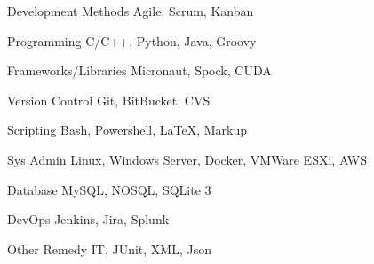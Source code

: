
\begin{cvskills}

  \cvskill
    {Development Methods} %
    {Agile, Scrum, Kanban} %

  \cvskill
    {Programming} %
    {C/C++, Python, Java, Groovy} %

  \cvskill
    {Frameworks/Libraries} %
    {Micronaut, Spock, CUDA} %

  \cvskill
    {Version Control} %
    {Git, BitBucket, CVS} %
    
  \cvskill
    {Scripting} %
    {Bash, Powershell, LaTeX, Markup} %

  \cvskill
    {Sys Admin} %
    {Linux, Windows Server, Docker, VMWare ESXi, AWS} %

    
  \cvskill
    {Database} %
    {MySQL, NOSQL, SQLite 3} %
    
  \cvskill
    {DevOps} %
    {Jenkins, Jira, Splunk} %
    
  \cvskill
    {Other} %
    {Remedy IT, JUnit, XML, Json} %
    
\end{cvskills}
